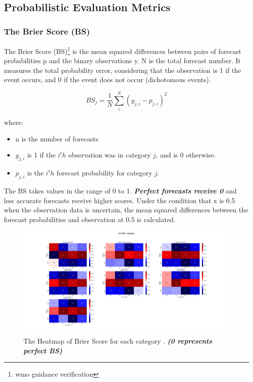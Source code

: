 \subsection{Probabilistic Evaluation Metrics}

\subsubsection{The Brier Score (BS)}
The Brier Score (BS)\footnote{wmo guidance verification} is the mean squared differences between pairs of forecast probabilities p and the binary observations y. N is the total forecast number. It measures the total probability error, considering that the observation is 1 if the event occurs, and 0 if the event does not occur (dichotomous events).

$$BS_j=\frac{1}{N} \sum\limits_{i}^{N} (y_{j,i} - p_{j,i})^2$$

where:
\begin{itemize}
	\item n is the number of forecasts
	\item $y_{j,i} $ is 1 if the $i^th$ observation was in category $j$, and is 0 otherwise.
	\item $p_{j,i}$  is the $i^th$ forecast probability for category $j$.
\end{itemize}
The BS takes values in the range of 0 to 1. \textbf{\textit{Perfect forecasts receive 0}} and less accurate forecasts receive higher scores. Under the condition that x is 0.5 when the observation data is uncertain, the mean squared differences between the forecast probabilities and observation at 0.5 is calculated.


\begin{figure}[H]
    \centering
    \includegraphics[scale=0.25]{bs_T2M_category.png}
    \caption{The Heatmap of Brier Score for each category  . \textbf{\textit{(0 represents perfect BS)}}}
\end{figure}

